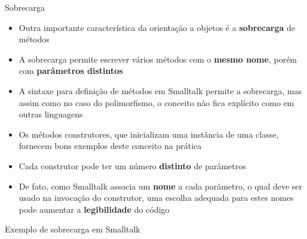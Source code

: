 \begin{frame}[fragile]{Sobrecarga}

    \begin{itemize}
        \item Outra importante característica da orientação a objetos é a \textbf{sobrecarga} de
            métodos

        \item A sobrecarga permite escrever vários métodos com o \textbf{mesmo nome}, porém
            com \textbf{parâmetros distintos}

        \item A sintaxe para definição de métodos em Smalltalk permite a sobrecarga, mas assim
            como no caso do polimorfismo, o conceito não fica explícito como em outras linguagens

        \item Os métodos construtores, que inicializam uma instância de uma classe, fornecem
            bons exemplos deste conceito na prática

        \item Cada construtor pode ter um número \textbf{distinto} de parâmetros

        \item De fato, como Smalltalk associa um \textbf{nome} a cada parâmetro, o qual deve ser 
            usado na invocação do construtor, uma escolha adequada para estes nomes pode aumentar 
            a \textbf{legibilidade} do código
    \end{itemize}

\end{frame}

\begin{frame}[fragile]{Exemplo de sobrecarga em Smalltalk}
\end{frame}

